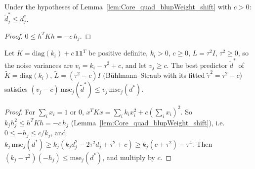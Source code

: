 \begin{corollary}\label{cor:Core_shift_self_le}
  \leanok
  Under the hypotheses of Lemma~\ref{lem:Core_quad_blupWeight_shift} with $c > 0$:
  $\tilde d^*_j \le d^*_j$.
\end{corollary}
\begin{proof}
  \leanok
  $0 \le h^TKh = -c\,h_j$.
\end{proof}

\begin{theorem}\label{thm:Core_shift_diagonal}
  \leanok
  Let $K = \mathrm{diag}(k_i) + c\,\mathbf 1\mathbf 1^T$ be positive definite, $k_i > 0$, $c \ge 0$,
  $L = \tau^2I$, $\tau^2 \ge 0$, so the noise variances are $v_i = k_i - \tau^2 + c$, and let
  $v_j \ge c$. The best predictor $\tilde d^*$ of $\tilde K = \mathrm{diag}(k_i)$,
  $\tilde L = (\tau^2 - c)I$ (Bühlmann--Straub with its fitted $\tilde\tau^2 = \tau^2 - c$) satisfies
  $(v_j - c)\,\mathrm{mse}_j(\tilde d^*) \le v_j\,\mathrm{mse}_j(d^*)$.
\end{theorem}
\begin{proof}
  \leanok
  For $\sum_i x_i = 1$ or $0$, $x^TKx = \sum_i k_ix_i^2 + c(\sum_i x_i)^2$. So
  $k_jh_j^2 \le h^TKh = -c\,h_j$ (Lemma~\ref{lem:Core_quad_blupWeight_shift}), i.e.
  $0 \le -h_j \le c/k_j$, and $k_j\,\mathrm{mse}_j(d^*) \ge k_j(k_jd_j^2 - 2\tau^2d_j + \tau^2 + c)
  \ge k_j(c + \tau^2) - \tau^4$. Then $(k_j - \tau^2)(-h_j) \le \mathrm{mse}_j(d^*)$, and multiply by $c$.
\end{proof}

